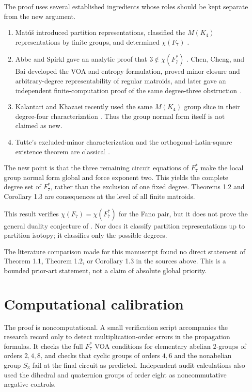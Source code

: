 \documentclass[11pt]{article}
\numberwithin{equation}{section}
\begin{document}
The proof uses several established ingredients whose roles should be kept
separate from the new argument.

\begin{enumerate}
\item Mat\'u\v{s} introduced partition representations, classified the
$M(K_4)$ representations by finite groups, and determined
$\chi(F_7)$ \cite{matus1999}.
\item Abbe and Spirkl gave an analytic proof that
$3\notin\chi(F_7^*)$ \cite[Lemma 9]{abbe2019}. Chen, Cheng, and Bai developed the
VOA and entropy formulation, proved minor closure and arbitrary-degree
representability of regular matroids, and later gave an independent
finite-computation proof of the same degree-three obstruction \cite{chen2025}.
\item Kalantari and Khazaei recently used the same $M(K_4)$ group slice in
their degree-four characterization \cite{kalantari2026}. Thus the group normal form itself
is not claimed as new.
\item Tutte's excluded-minor characterization and the orthogonal-Latin-square
existence theorem are classical \cite{oxley2011,bose1960}.

\end{enumerate}

The new point is that the three remaining circuit equations of $F_7^*$
make the local group normal form global and force exponent two. This yields
the complete degree set of $F_7^*$, rather than the exclusion of one fixed
degree. Theorems 1.2 and Corollary 1.3 are consequences at the level of all
finite matroids.

This result verifies
$\chi(F_7)=\chi(F_7^*)$ for the Fano pair, but it does not prove the general
duality conjecture of \cite{chen2025}. Nor does it classify partition representations up
to partition isotopy; it classifies only the possible degrees.

The literature comparison made for this manuscript found no direct statement
of Theorem 1.1, Theorem 1.2, or Corollary 1.3 in the sources above. This is a
bounded prior-art statement, not a claim of absolute global priority.

\section{Computational calibration}


The proof is noncomputational. A small verification script accompanies the
research record only to detect multiplication-order errors in the propagation
formulas. It checks the full $F_7^*$ VOA conditions for elementary abelian
2-groups of orders $2,4,8$, and checks that cyclic groups of orders $4,6$
and the nonabelian group $S_3$ fail at the final circuit as predicted.
Independent audit calculations also used the dihedral and quaternion groups
of order eight as noncommutative negative controls.
\end{document}

